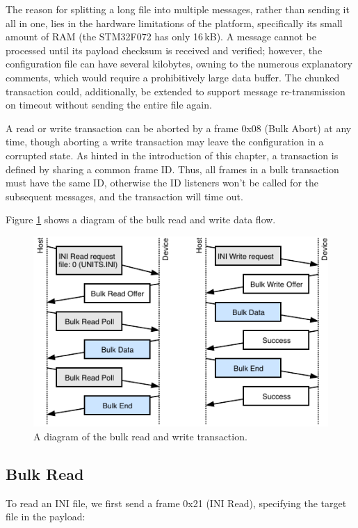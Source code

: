 The reason for splitting a long file into multiple messages, rather than sending it all in one, lies in the hardware limitations of the platform, specifically its small amount of \gls{RAM} (the STM32F072 has only 16\,kB). A message cannot be processed until its payload checksum is received and verified; however, the configuration file can have several kilobytes, owning to the numerous explanatory comments, which would require a prohibitively large data buffer. The chunked transaction could, additionally, be extended to support message re-transmission on timeout without sending the entire file again.

A read or write transaction can be aborted by a frame 0x08 (Bulk Abort) at any time, though aborting a write transaction may leave the configuration in a corrupted state. As hinted in the introduction of this chapter, a transaction is defined by sharing a common frame ID. Thus, all frames in a bulk transaction must have the same ID, otherwise the ID listeners won't be called for the subsequent messages, and the transaction will time out.

Figure \ref{fig:bulk-rw} shows a diagram of the bulk read and write data flow.

\begin{figure}
	\centering
	\includegraphics[scale=1.5]{img/bulk-read-write.pdf}
	\caption{\label{fig:bulk-rw}A diagram of the bulk read and write transaction.}
\end{figure}

\subsection{Bulk Read}

To read an INI file, we first send a frame 0x21 (INI Read), specifying the target file in the payload:

